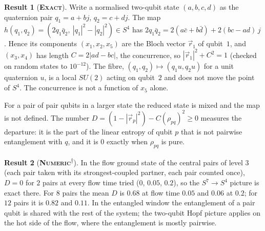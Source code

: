 \documentclass[11pt]{article}
\newcommand{\exact}{\textbf{\textsc{Exact}}}
\newcommand{\numeric}{\textbf{\textsc{Numeric}}}
\newcommand{\snap}{\textsuperscript{$\dagger$}}      %
\theoremstyle{definition}
\newtheorem{result}{Result}
\begin{document}
\begin{result}[\exact]\label{res:hopf-s4}
Write a normalised two-qubit state $(a,b,c,d)$ as the quaternion pair $q_1=a+bj$, $q_2=c+dj$. The map $h(q_1,q_2)=(2q_1\bar q_2,\ |q_1|^2-|q_2|^2)\in S^4$ has $2q_1\bar q_2=2(a\bar c+b\bar d)+2(bc-ad)\,j$. Hence its components $(x_1,x_2,x_5)$ are the Bloch vector $\vec r_1$ of qubit~$1$, and $(x_3,x_4)$ has length $C=2|ad-bc|$, the concurrence, so $|\vec r_1|^2+C^2=1$ (checked on random states to $10^{-12}$). The fibre, $(q_1,q_2)\mapsto(q_1u,q_2u)$ for a unit quaternion $u$, is a local $SU(2)$ acting on qubit~$2$ and does not move the point of $S^4$. The concurrence is not a function of $x_5$ alone.
\end{result}
For a pair of pair qubits in a larger state the reduced state is mixed and the map is not defined. The number $D=(1-|\vec r_p|^2)-C(\rho_{pq})^2\ge0$ measures the departure: it is the part of the linear entropy of qubit $p$ that is not pairwise entanglement with $q$, and it is $0$ exactly when $\rho_{pq}$ is pure.
\begin{result}[\numeric\snap]\label{res:hopf-leak}
In the flow ground state of the central pairs of level $3$ (each pair taken with its strongest-coupled partner, each pair counted once), $D=0$ for $2$ pairs at every flow time tried ($0$, $0.05$, $0.2$), so the $S^7\to S^4$ picture is exact there. For $8$ pairs the mean $D$ is $0.68$ at flow time $0.05$ and $0.06$ at $0.2$; for $12$ pairs it is $0.82$ and $0.11$. In the entangled window the entanglement of a pair qubit is shared with the rest of the system; the two-qubit Hopf picture applies on the hot side of the flow, where the entanglement is mostly pairwise.
\end{result}
\end{document}
